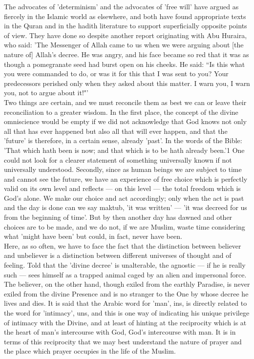 \documentclass[10pt, twoside,openright]{book}
\begin{document}
The advocates of 'determinism' and the advocates of 'free will' have argued as fiercely in the 
Islamic world as elsewhere, and both have found appropriate texts in the Quran and in the hadith 
literature to support superficially opposite points of view. They have done so despite another report 
originating with Abu Huraira, who said: 'The Messenger of Allah came to us when we were arguing about 
[the nature of] Allah's decree. He was angry, and his face became so red that it was as though a 
pomegranate seed had burst open on his cheeks. He said: ``Is this what you were commanded to do, or 
was it for this that I was sent to you? Your predecessors perished only when they asked about this 
matter. I warn you, I warn you, not to argue about it!"' \\

Two things are certain, and we must reconcile them as best we can or leave their reconciliation to a 
greater wisdom. In the first place, the concept of the divine omniscience would be empty if we did 
not acknowledge that God knows not only all that has ever happened but also all that will ever 
happen, and that the 'future' is therefore, in a certain sense, already 'past'. In the words of the 
Bible: 'That which hath been is now; and that which is to be hath already been.'1 One could not look 
for a clearer statement of something universally known if not universally understood. Secondly, since 
as human beings we are subject to time and cannot see the future, we have an experience of free 
choice which is perfectly valid on its own level and reflects --- on this level --- the total freedom 
which is God's alone. We make our choice and act accordingly; only when the act is past and the day 
is done can we say maktub, 'it was written' --- 'it was decreed for us from the beginning of time'. But 
by then another day has dawned and other choices are to be made, and we do not, if we are Muslim, 
waste time considering what 'might have been' but could, in fact, never have been. \\

Here, as so often, we have to face the fact that the distinction between believer and unbeliever is a 
distinction between different universes of thought and of feeling. Told that the 'divine decree' is 
unalterable, the agnostic --- if he is really such --- sees himself as a trapped animal caged by an alien 
and impersonal force. The believer, on the other hand, though exiled from the earthly Paradise, is 
never exiled from the divine Presence and is no stranger to the One by whose decree he lives and 
dies. It is said that the Arabic word for 'man', ins, is directly related to the word for 'intimacy', 
uns, and this is one way of indicating his unique privilege of intimacy with the Divine, and at least 
of hinting at the reciprocity which is at the heart of man's intercourse with God, God's intercourse 
with man. It is in terms of this reciprocity that we may best understand the nature of prayer and the 
place which prayer occupies in the life of the Muslim. \\
\end{document}
